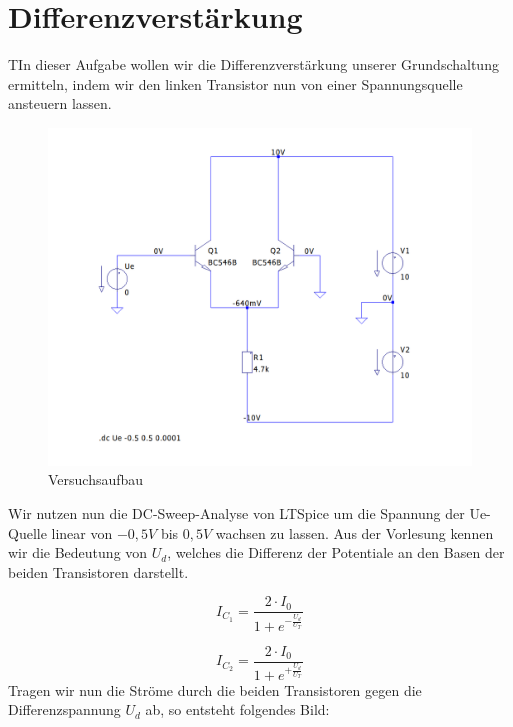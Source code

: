 \documentclass{article}
\begin{document}
\section{Differenzverstärkung }

\begin{task}
  TIn dieser Aufgabe wollen wir die Differenzverstärkung unserer Grundschaltung ermitteln, indem wir den linken Transistor nun von einer Spannungsquelle
  ansteuern lassen.
\end{task}

\begin{figure}[h]
  \centering
  \includegraphics[scale=0.5]{../assets/images/EL2P1/aufgabe2schalt.png}
  \caption{Versuchsaufbau}
  \label{fig:schalt2}
\end{figure}

Wir nutzen nun die DC-Sweep-Analyse von LTSpice um die Spannung der Ue-Quelle linear von $-0,5V$ bis $0,5V$
wachsen zu lassen. Aus der Vorlesung kennen wir die Bedeutung von $U_d$, welches die Differenz der
Potentiale an den Basen der beiden Transistoren darstellt.\cite{skript}

\begin{equation}
  I_{C_{1}} = \frac{2\cdot I_{0}}{1+e^{-\frac{U_{d}}{U_{T}}}}
\end{equation}

\begin{equation}
  \label{eq:10}
  I_{C_{2}} = \frac{2\cdot I_{0}}{1+e^{+\frac{U_{d}}{U_{T}}}}
\end{equation}
\newpage
Tragen wir nun die Ströme durch die beiden Transistoren gegen die Differenzspannung $U_d$ ab, so
entsteht folgendes Bild:
\end{document}
